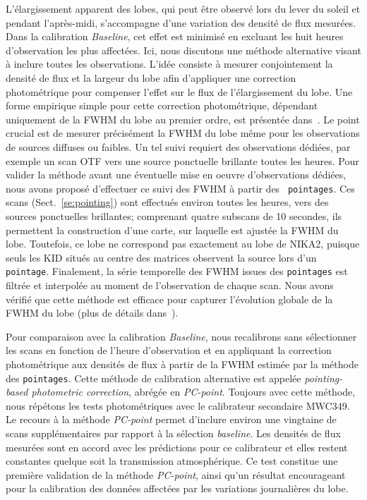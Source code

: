 L'élargissement apparent des lobes, qui peut être observé lors du lever
du soleil et pendant l'après-midi, s'accompagne d'une variation des
densité de flux mesurées. Dans la calibration \emph{Baseline}, cet
effet est minimisé en excluant les huit heures d'observation les plus
affectées. Ici, nous discutons une méthode alternative visant à
inclure toutes les observations. L'idée consiste à mesurer
conjointement la densité de flux et la largeur du lobe afin
d'appliquer une correction photométrique pour compenser l'effet sur le
flux de l'élargissement du lobe. Une forme empirique simple pour cette
correction photométrique, dépendant uniquement de la FWHM du lobe au
premier ordre, est présentée dans~\citet{Perotto2019}. Le point
crucial est de mesurer précisément la FWHM du lobe même pour les
observations de sources diffuses ou faibles. Un tel suivi requiert des
observations dédiées, par exemple un scan OTF vers une source
ponctuelle brillante toutes les heures. Pour valider la méthode avant
une éventuelle mise en oeuvre d'observations dédiées, nous avons
proposé d'effectuer ce suivi des FWHM à partir des {\tt
  pointages}. Ces scans (Sect.~\ref{se:pointing}) sont effectués
environ toutes les heures, vers des sources ponctuelles brillantes;
comprenant quatre subscans de 10 secondes, ils permettent la
construction d'une carte, sur laquelle est ajustée la FWHM du
lobe. Toutefois, ce lobe ne correspond pas exactement au lobe de
NIKA2, puisque seuls les KID situés au centre des matrices observent
la source lors d'un {\tt pointage}. Finalement, la série temporelle
des FWHM issues des {\tt pointages} est filtrée et interpolée au
moment de l'observation de chaque scan. Nous avons vérifié que cette
méthode est efficace pour capturer l'évolution globale de la FWHM du
lobe (plus de détails dans~\citet{Perotto2019}).

Pour comparaison avec la calibration \emph{Baseline}, nous recalibrons
sans sélectionner les scans en fonction de l'heure d'observation et
en appliquant la correction photométrique aux densités de flux à
partir de la FWHM estimée par la méthode des {\tt pointages}. Cette
méthode de calibration alternative est appelée \emph{pointing-based
  photometric correction}, abrégée en \emph{PC-point}. Toujours avec
cette méthode, nous répétons les tests photométriques avec le
calibrateur secondaire MWC349. Le recours à la méthode \emph{PC-point}
permet d'inclure environ une vingtaine de scans supplémentaires par
rapport à la sélection \emph{baseline}. Les densités de flux mesurées
sont en accord avec les prédictions pour ce calibrateur et elles
restent constantes quelque soit la transmission atmosphérique. Ce test
constitue une première validation de la méthode \emph{PC-point}, ainsi
qu'un résultat encourageant pour la calibration des données affectées
par les variations journalières du lobe.



